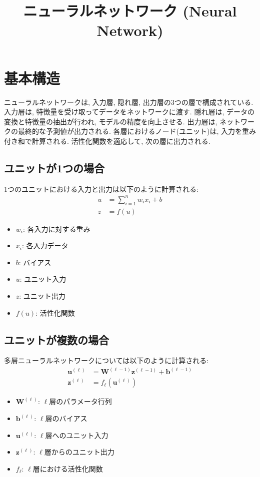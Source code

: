 \documentclass[dvipdfmx, 10pt]{jsarticle}
\title{\textbf{ニューラルネットワーク (Neural Network)}}
\author{}
\date{}
\begin{document}
\maketitle

\section*{基本構造}
ニューラルネットワークは, 入力層, 隠れ層, 出力層の3つの層で構成されている. 
入力層は, 特徴量を受け取ってデータをネットワークに渡す. 隠れ層は, データの変換と特徴量の抽出が行われ, モデルの精度を向上させる. 
出力層は, ネットワークの最終的な予測値が出力される. 
各層におけるノード(ユニット)は, 入力を重み付き和で計算される. 活性化関数を適応して, 次の層に出力される. 

\begin{oframed}
\subsection*{ユニットが1つの場合}
1つのユニットにおける入力と出力は以下のように計算される: 
\begin{align*}
    u &= \sum_{i=1}^n w_i x_i + b \\
    z &= f(u)
\end{align*}

\begin{itemize}
    \item $w_i$: 各入力に対する重み
    \item $x_i$: 各入力データ
    \item $b$: バイアス
    \item $u$: ユニット入力
    \item $z$: ユニット出力
    \item $f(u)$: 活性化関数
\end{itemize}

\subsection*{ユニットが複数の場合}
多層ニューラルネットワークについては以下のように計算される: 
\begin{align*}
    \mathbf{u}^{(\ell)} &= \mathbf{W}^{(\ell-1)} \mathbf{z}^{(\ell-1)} + \mathbf{b}^{(\ell-1)} \\
    \mathbf{z}^{(\ell)} &= f_{\ell}(\mathbf{u}^{(\ell)})
\end{align*}

\begin{itemize}
    \item $\mathbf{W}^{(\ell)}$: $\ell$層のパラメータ行列
    \item $\mathbf{b}^{(\ell)}$: $\ell$層のバイアス
    \item $\mathbf{u}^{(\ell)}$: $\ell$層へのユニット入力
    \item $\mathbf{z}^{(\ell)}$: $\ell$層からのユニット出力
    \item $f_{\ell}$: $\ell$層における活性化関数
\end{itemize}

\end{oframed}
\end{document}
